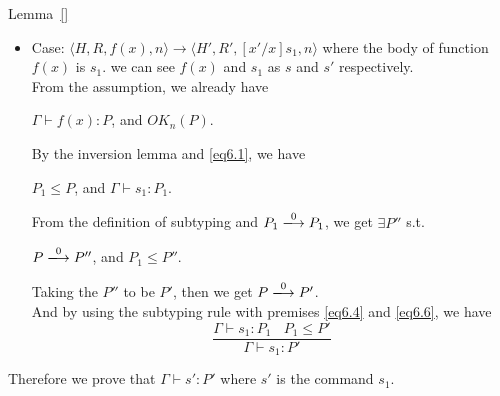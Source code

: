 \begin{pfof}{Lemma~\ref{}}
\begin{itemize}
Taking P as P'. Because of the following derivation, \eqref{eqc.5} holds.
$$
  \frac{\Theta; \Gamma' \vdash s_{1} : P_{1} \ \ \ \ P_{1} \le P}
  {\Theta; \Gamma' \vdash s_{1} : P}
  \Rtab \mbox{(T-Sub)}
$$

And by the definition of $\xlongrightarrow{\tau}^{*}$, \eqref{eqc.6} holds. \\

\item Case: $\langle H, R, f(x) , n \rangle \rightarrow  \langle H', R', [x'/x]s_{1}, n  \rangle $ where the body of function $f(x)$ is $s_{1}$. we can see $f(x)$ and $s_{1}$ as $s$ and $s'$ respectively. \\

From the assumption, we already have
\begin{center}
$\Gamma \vdash f(x) : P$, and $OK_{n}(P)$.
\end{center}

By the inversion lemma and \eqref{eq6.1}, we have
\begin{center}
$P_{1} \le P$, and $\Gamma \vdash s_{1} : P_{1}$.
\end{center}

From the definition of subtyping and $P_{1} \xlongrightarrow{0} P_{1}$, we get $\exists P''$ s.t.
\begin{center}
$P \xlongrightarrow{0} P''$, and $P_{1} \le P''$.
\end{center}

Taking the $P''$ to be $P'$, then we get $P \xlongrightarrow{0} P'$.\\
And by using the subtyping rule with premises \eqref{eq6.4} and  \eqref{eq6.6}, we have
$$
\frac{\Gamma \vdash s_{1} : P_{1} \ \ \ \ P_{1} \le P'}{\Gamma \vdash s_{1} : P'}
$$
\end{itemize}

Therefore we prove that $\Gamma \vdash s' : P'$ where $s'$ is the command $s_{1}$.

\end{pfof}
